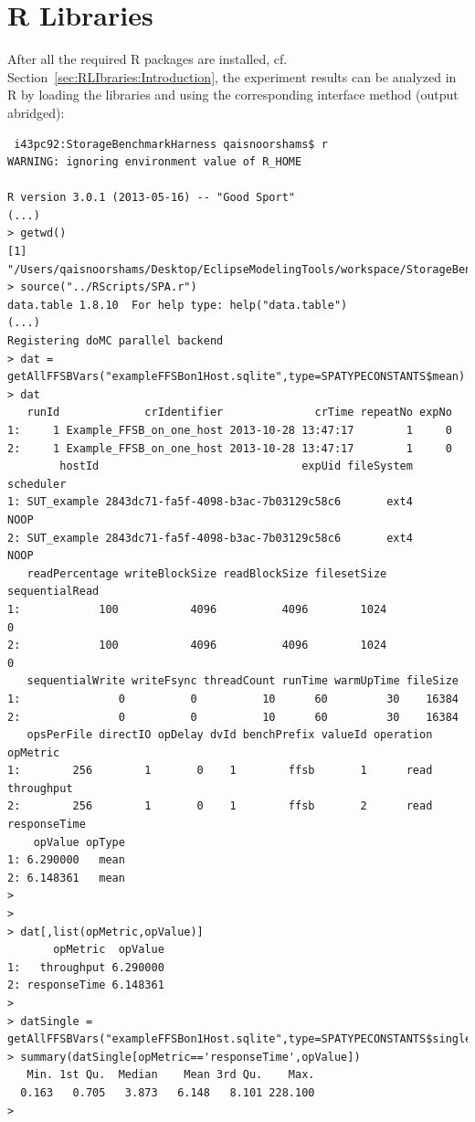 \section{R Libraries}

After all the required R packages are installed, cf. Section~\ref{sec:RLIbraries:Introduction}, the experiment results can be analyzed in R by loading the libraries and using the corresponding interface method (output abridged):

\begin{lstlisting}
 i43pc92:StorageBenchmarkHarness qaisnoorshams$ r
WARNING: ignoring environment value of R_HOME

R version 3.0.1 (2013-05-16) -- "Good Sport"
(...)
> getwd()
[1] "/Users/qaisnoorshams/Desktop/EclipseModelingTools/workspace/StorageBenchmarkHarness"
> source("../RScripts/SPA.r")
data.table 1.8.10  For help type: help("data.table")
(...)
Registering doMC parallel backend
> dat = getAllFFSBVars("exampleFFSBon1Host.sqlite",type=SPATYPECONSTANTS$mean)
> dat
   runId             crIdentifier              crTime repeatNo expNo
1:     1 Example_FFSB_on_one_host 2013-10-28 13:47:17        1     0
2:     1 Example_FFSB_on_one_host 2013-10-28 13:47:17        1     0
        hostId                               expUid fileSystem scheduler
1: SUT_example 2843dc71-fa5f-4098-b3ac-7b03129c58c6       ext4      NOOP
2: SUT_example 2843dc71-fa5f-4098-b3ac-7b03129c58c6       ext4      NOOP
   readPercentage writeBlockSize readBlockSize filesetSize sequentialRead
1:            100           4096          4096        1024              0
2:            100           4096          4096        1024              0
   sequentialWrite writeFsync threadCount runTime warmUpTime fileSize
1:               0          0          10      60         30    16384
2:               0          0          10      60         30    16384
   opsPerFile directIO opDelay dvId benchPrefix valueId operation     opMetric
1:        256        1       0    1        ffsb       1      read   throughput
2:        256        1       0    1        ffsb       2      read responseTime
    opValue opType
1: 6.290000   mean
2: 6.148361   mean
>
>
> dat[,list(opMetric,opValue)]
       opMetric  opValue
1:   throughput 6.290000
2: responseTime 6.148361
> 
> datSingle = getAllFFSBVars("exampleFFSBon1Host.sqlite",type=SPATYPECONSTANTS$singleValue)
> summary(datSingle[opMetric=='responseTime',opValue])
   Min. 1st Qu.  Median    Mean 3rd Qu.    Max. 
  0.163   0.705   3.873   6.148   8.101 228.100 
> 
\end{lstlisting}

